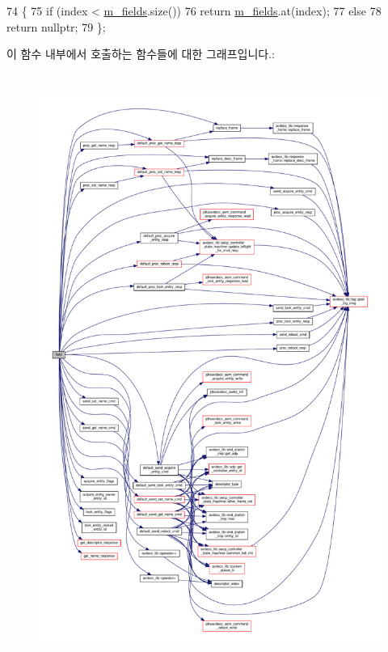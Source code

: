 \begin{DoxyCode}
74     \{
75         \textcolor{keywordflow}{if} (index < \hyperlink{classavdecc__lib_1_1descriptor__base__imp_adce67136eb9c66da9c189b730077b9cd}{m\_fields}.size())
76             \textcolor{keywordflow}{return} \hyperlink{classavdecc__lib_1_1descriptor__base__imp_adce67136eb9c66da9c189b730077b9cd}{m\_fields}.at(index);
77         \textcolor{keywordflow}{else}
78             \textcolor{keywordflow}{return} \textcolor{keyword}{nullptr};
79     \};
\end{DoxyCode}


이 함수 내부에서 호출하는 함수들에 대한 그래프입니다.\+:
\nopagebreak
\begin{figure}[H]
\begin{center}
\leavevmode
\includegraphics[height=550pt]{classavdecc__lib_1_1descriptor__base__imp_a5f8127d32e2aa54777ca03bf09e8d7b5_cgraph}
\end{center}
\end{figure}


